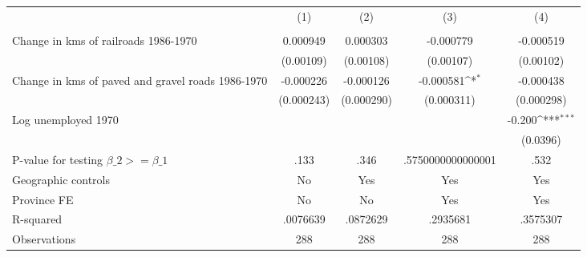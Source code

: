 {
\def\sym#1{\ifmmode^{#1}\else\(^{#1}\)\fi}
\begin{tabular}{l*{4}{c}}
\hline\hline
                &\multicolumn{1}{c}{(1)}&\multicolumn{1}{c}{(2)}&\multicolumn{1}{c}{(3)}&\multicolumn{1}{c}{(4)}\\
                &\multicolumn{1}{c}{}&\multicolumn{1}{c}{}&\multicolumn{1}{c}{}&\multicolumn{1}{c}{}\\
\hline
Change in kms of railroads 1986-1970& 0.000949         & 0.000303         &-0.000779         &-0.000519         \\
                &(0.00109)         &(0.00108)         &(0.00107)         &(0.00102)         \\
[1em]
Change in kms of paved and gravel roads 1986-1970&-0.000226         &-0.000126         &-0.000581\sym{*}  &-0.000438         \\
                &(0.000243)         &(0.000290)         &(0.000311)         &(0.000298)         \\
[1em]
Log unemployed 1970&                  &                  &                  &   -0.200\sym{***}\\
                &                  &                  &                  & (0.0396)         \\
\hline
P-value for testing $\beta\_{2} >= \beta\_{1}$&     .133         &     .346         &.5750000000000001         &     .532         \\
Geographic controls&       No         &      Yes         &      Yes         &      Yes         \\
Province FE     &       No         &       No         &      Yes         &      Yes         \\
R-squared       & .0076639         & .0872629         & .2935681         & .3575307         \\
Observations    &      288         &      288         &      288         &      288         \\
\hline\hline
\end{tabular}
}
